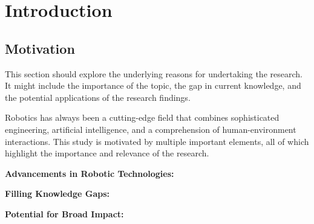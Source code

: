 \chapter{Introduction}

\graphicspath{{./Figures/Modeling}}



\section{Motivation}
This section should explore the underlying reasons for undertaking the research. It might include the importance of the topic, the gap in current knowledge, and the potential applications of the research findings.



Robotics has always been a cutting-edge field that combines sophisticated engineering, artificial intelligence, and a comprehension of human-environment interactions. This study is motivated by multiple important elements, all of which highlight the importance and relevance of the research.

\textbf{Advancements in Robotic Technologies:}%

\textbf{Filling Knowledge Gaps:} %

\textbf{Potential for Broad Impact:} %

